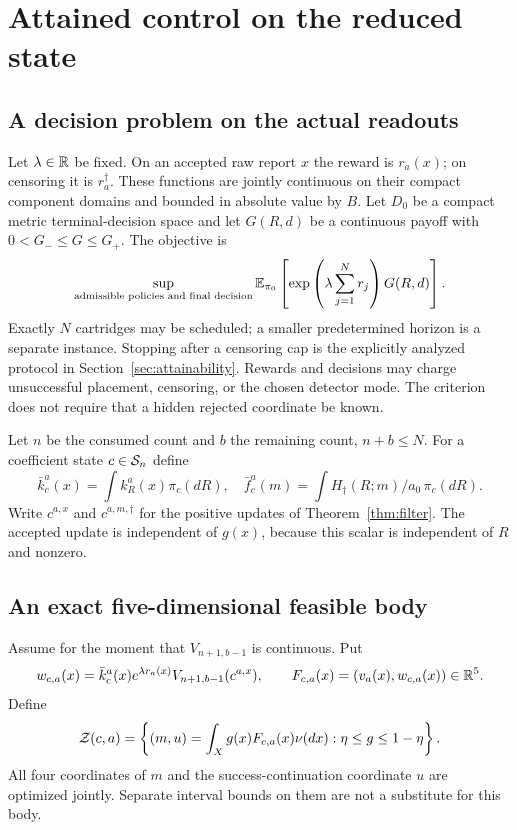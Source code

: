 \section{Attained control on the reduced state}\label{sec:control}
\subsection{A decision problem on the actual readouts}
Let $\lambda\in\mathbb R$ be fixed. On an accepted raw report $x$ the reward is
$r_a(x)$; on censoring it is $r_a^\dagger$. These functions are jointly
continuous on their compact component domains and bounded in absolute value
by $B$. Let $D_0$ be a compact metric terminal-decision space and let
$G(R,d)$ be a continuous payoff with $0<G_-\le G\le G_+$. The objective is
\begin{equation}
 \sup_{\text{admissible policies and final decision}}
 \mathbb E_{\pi_0}\left[\exp\left(\lambda\sum_{j=1}^N r_j\right)G(R,d)\right].
 \label{eq:objective}
\end{equation}
Exactly $N$ cartridges may be scheduled; a smaller predetermined horizon is
a separate instance. Stopping after a censoring cap is the explicitly
analyzed protocol in Section~\ref{sec:attainability}. Rewards and decisions
may charge unsuccessful placement, censoring, or the chosen detector mode.
The criterion does not require that a hidden rejected coordinate be known.

Let $n$ be the consumed count and $b$ the remaining count, $n+b\le N$.
For a coefficient state $c\in\mathcal S_n$ define
\[
 \bar k_c^a(x)=\int k_R^a(x)\pi_c(dR),\quad
 \bar f_c^a(m)=\int H_\dagger(R;m)/a_0\,\pi_c(dR).
\]
Write $c^{a,x}$ and $c^{a,m,\dagger}$ for the positive updates of
Theorem~\ref{thm:filter}. The accepted update is independent of $g(x)$,
because this scalar is independent of $R$ and nonzero.

\subsection{An exact five-dimensional feasible body}
Assume for the moment that $V_{n+1,b-1}$ is continuous. Put
\[
 w_{c,a}(x)=\bar k_c^a(x)e^{\lambda r_a(x)}
                    V_{n+1,b-1}(c^{a,x}),\qquad
 F_{c,a}(x)=(v_a(x),w_{c,a}(x))\in\mathbb R^5.
\]
Define
\begin{equation}
 \mathcal Z(c,a)=\left\{(m,u)=\int_X g(x)F_{c,a}(x)\nu(dx):
                               \eta\le g\le1-\eta\right\}.
 \label{eq:gate-body}
\end{equation}
All four coordinates of $m$ and the success-continuation coordinate $u$
are optimized jointly. Separate interval bounds on them are not a substitute
for this body.

